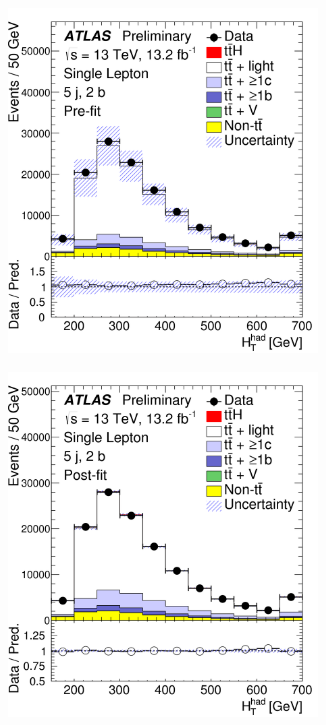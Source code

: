 \begin{figure}[htbp!]
\begin{subfigure}{0.24\textwidth}
  \caption{}
  \label{}
\end{subfigure}
\begin{subfigure}{0.24\textwidth}
  \centering
  \includegraphics[width=0.9\textwidth]{figures/ttH/fig_08a.png}
  \caption{}
  \label{}
\end{subfigure}
\begin{subfigure}{0.24\textwidth}
  \centering
  \includegraphics[width=0.9\textwidth]{figures/ttH/fig_08b.png}

\end{subfigure}
\end{figure}
